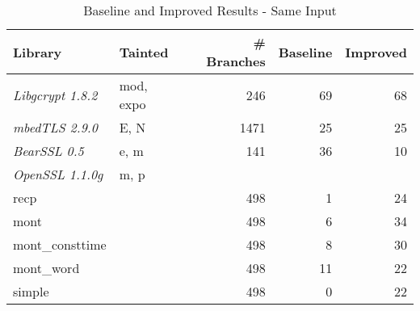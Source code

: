 \documentclass[11pt,a4paper]{article}
\begin{document}
\begin{table}
   \caption{Baseline and Improved Results - Same Input}
   \centering
   \begin{tabular}{|l| l| r r r|}
     \hline
 \textbf{Library} & \textbf{Tainted} & \textbf{\# Branches} & \textbf{Baseline} & \textbf{Improved} \\
     \hline
 \textit{Libgcrypt 1.8.2} & mod, expo&	246 &	69 &	68 \\
 \textit{mbedTLS 2.9.0} & E, N&	1471 &	25 &	25 \\
 \textit{BearSSL 0.5} & e, m&	141 &	36 &	10 \\
 \textit{OpenSSL 1.1.0g} & m, p&  & & \\
 recp	& & 498 &	1 &	24 \\
 mont	& & 498 &	6 &	34 \\
 mont\_consttime	& & 498 &	8 &	30\\
 mont\_word	& & 498 &	11 &	22\\
 simple	& & 498 &	0 &	22 \\
     \hline
   \end{tabular}
   \label{tbl:baseline_improved_same}
 \end{table}
\end{document}
